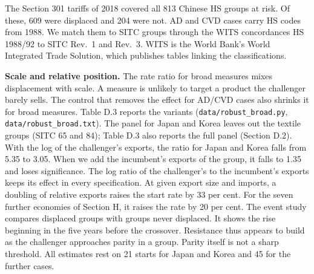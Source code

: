 The Section 301 tariffs of 2018 covered all 813 Chinese HS groups at
risk. Of these, 609 were displaced and 204 were not. AD and CVD cases
carry HS codes from 1988. We match them to SITC groups through the WITS
concordances HS 1988/92 to SITC Rev.~1 and Rev.~3. WITS is the World
Bank's World Integrated Trade Solution, which publishes tables linking
the classifications.

\textbf{Scale and relative position.} The rate ratio for broad measures
mixes displacement with scale. A measure is unlikely to target a product
the challenger barely sells. The control that removes the effect for
AD/CVD cases also shrinks it for broad measures. Table D.3 reports the
variants (\texttt{data/\allowbreak{}robust\_\allowbreak{}broad.py},
\texttt{data/\allowbreak{}robust\_\allowbreak{}broad.txt}). The panel for Japan and Korea leaves
out the textile groups (SITC 65 and 84); Table D.3 also reports the full
panel (Section D.2). With the log of the challenger's exports, the ratio
for Japan and Korea falls from 5.35 to 3.05. When we add the incumbent's
exports of the group, it falls to 1.35 and loses significance. The log
ratio of the challenger's to the incumbent's exports keeps its effect in
every specification. At given export size and imports, a doubling of
relative exports raises the start rate by 33 per cent. For the seven
further economies of Section H, it raises the rate by 20 per cent. The
event study compares displaced groups with groups never displaced. It
shows the rise beginning in the five years before the crossover.
Resistance thus appears to build as the challenger approaches parity in
a group. Parity itself is not a sharp threshold. All estimates rest on
21 starts for Japan and Korea and 45 for the further cases.

